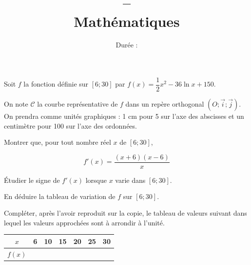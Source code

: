 \documentclass[a4paper,12pt]{scrartcl}
\date{}
\title{\typedevoir{} -- \classe{}\writecorrword{} \\
Mathématiques}
\author{Durée : \duree{}}
\begin{document}
\maketitle





Soit $f$ la fonction définie sur $[6; 30]$ par $f(x) = \dfrac{1}{2}x^2 - 36 \ln x + 150$.  

On note $\mathcal{C}$ la courbe représentative de $f$ dans un repère orthogonal $\left(O ; \overrightarrow{i} ; \overrightarrow{j} \right)$. On prendra comme unités graphiques : 1 cm pour 5 sur l'axe des abscisses et un centimètre pour 100 sur l'axe des ordonnées.
 
 
 \subquestion{}
 Montrer que, pour tout nombre réel $x$ de $[6;30]$,
 
\begin{equation*}
f'(x) = \dfrac{(x+6)(x-6)}{x}
\end{equation*}

 
 \subquestion{}
 Étudier le signe de $f'(x)$ lorsque $x$ varie dans $[6;30]$.

 
 \subquestion{}
 En déduire la tableau de variation de $f$ sur $[6;30]$.

 
 
 \subquestion{}
Compléter, après l'avoir reproduit sur la copie, le tableau de valeurs suivant dans lequel les valeurs approchées sont à arrondir à l'unité.

\begin{center}
\begin{tabular}{|c|c|c|c|c|c|c|}
\hline
$x$    & 6 & 10 & 15 & 20 & 25 & 30 \\ \hline
$f(x)$ & \hspace{15mm}  &  \hspace{15mm}  &  \hspace{15mm}  &  \hspace{15mm}  &  \hspace{15mm}  &  \hspace{15mm}  \\ \hline
\end{tabular}
\end{center}
\end{document}
